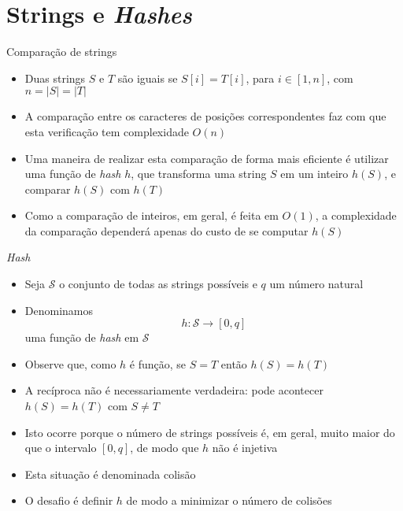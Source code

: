 \section{Strings e {\it Hashes}}

\begin{frame}[fragile]{Comparação de strings}

    \begin{itemize}
        \item Duas strings $S$ e $T$ são iguais se $S[i] = T[i]$, para $i\in [1,n]$, com
            $n = |S| = |T|$

        \item A comparação entre os caracteres de posições correspondentes faz com que esta
            verificação tem complexidade $O(n)$

        \item Uma maneira de realizar esta comparação de forma mais eficiente é utilizar uma 
            função de 
            \textit{hash} $h$, que transforma uma string $S$ em um inteiro $h(S)$, e comparar
            $h(S)$ com $h(T)$

        \item Como a comparação de inteiros, em geral, é feita em $O(1)$, a complexidade da 
            comparação dependerá apenas do custo de se computar $h(S)$
    \end{itemize}

\end{frame}

\begin{frame}[fragile]{{\it Hash}}

    \begin{itemize}
        \item Seja $\mathcal{S}$ o conjunto de todas as strings possíveis e $q$ um número natural

        \item Denominamos
        \[
            h: \mathcal{S} \to [0,q]
        \]
        uma função de \textit{hash} em $\mathcal{S}$

        \item Observe que, como $h$ é função, se $S = T$ então $h(S) = h(T)$

        \item A recíproca não é necessariamente verdadeira: pode acontecer $h(S) = h(T)$ com
            $S\neq T$

        \item Isto ocorre porque o número de strings possíveis é, em geral, muito maior do que
            o intervalo $[0,q]$, de modo que $h$ não é injetiva

        \item Esta situação é denominada colisão

        \item O desafio é definir $h$ de modo a minimizar o número de colisões

    \end{itemize}

\end{frame}
